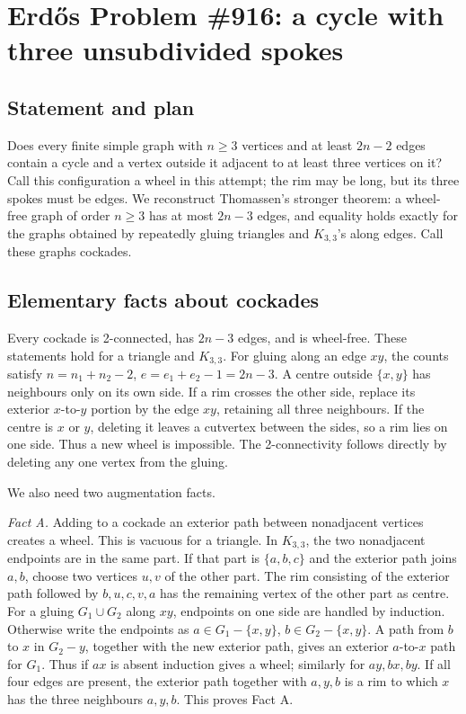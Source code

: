 \section*{Erd\H{o}s Problem \#916: a cycle with three unsubdivided spokes}
\subsection*{Statement and plan}
Does every finite simple graph with \(n\geq3\) vertices and at least \(2n-2\) edges contain a cycle and a vertex outside it adjacent to at least three vertices on it?
Call this configuration a wheel in this attempt; the rim may be long, but its three spokes must be edges.
We reconstruct Thomassen's stronger theorem: a wheel-free graph of order \(n\geq3\) has at most \(2n-3\) edges, and equality holds exactly for the graphs obtained by repeatedly gluing triangles and \(K_{3,3}\)'s along edges. Call these graphs cockades.

\subsection*{Elementary facts about cockades}
Every cockade is 2-connected, has \(2n-3\) edges, and is wheel-free.
These statements hold for a triangle and \(K_{3,3}\).
For gluing along an edge \(xy\), the counts satisfy
\(n=n_1+n_2-2\), \(e=e_1+e_2-1=2n-3\).
A centre outside \(\{x,y\}\) has neighbours only on its own side. If a rim crosses the other side, replace its exterior \(x\)-to-\(y\) portion by the edge \(xy\), retaining all three neighbours.
If the centre is \(x\) or \(y\), deleting it leaves a cutvertex between the sides, so a rim lies on one side. Thus a new wheel is impossible.
The 2-connectivity follows directly by deleting any one vertex from the gluing.

We also need two augmentation facts.

\emph{Fact A.} Adding to a cockade an exterior path between nonadjacent vertices creates a wheel.
This is vacuous for a triangle. In \(K_{3,3}\), the two nonadjacent endpoints are in the same part. If that part is \(\{a,b,c\}\) and the exterior path joins \(a,b\), choose two vertices \(u,v\) of the other part. The rim consisting of the exterior path followed by \(b,u,c,v,a\) has the remaining vertex of the other part as centre.
For a gluing \(G_1\cup G_2\) along \(xy\), endpoints on one side are handled by induction.
Otherwise write the endpoints as \(a\in G_1-\{x,y\}\), \(b\in G_2-\{x,y\}\).
A path from \(b\) to \(x\) in \(G_2-y\), together with the new exterior path, gives an exterior \(a\)-to-\(x\) path for \(G_1\).
Thus if \(ax\) is absent induction gives a wheel; similarly for \(ay,bx,by\).
If all four edges are present, the exterior path together with \(a,y,b\) is a rim to which \(x\) has the three neighbours \(a,y,b\).
This proves Fact A.

